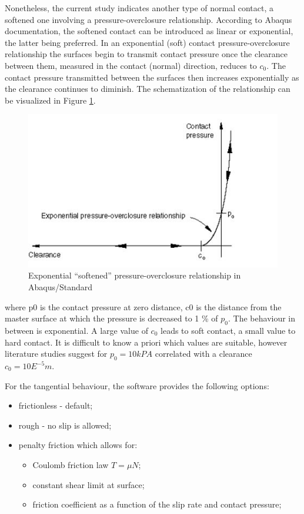 Nonetheless, the current study indicates another type of normal contact, a softened one involving a pressure-overclosure relationship. According to Abaqus documentation, the softened contact can be introduced as linear or exponential, the latter being preferred. In an exponential (soft) contact pressure-overclosure relationship the surfaces begin to transmit contact pressure once the clearance between them, measured in the contact (normal) direction, reduces to $c_0$. The contact pressure transmitted between the surfaces then increases exponentially as the clearance continues to diminish. The schematization of the relationship can be visualized in Figure \ref{pressure}.
\begin{figure}[!h]
	\centering
	\includegraphics[width=0.45 \linewidth]{"pressure"}
	\caption{Exponential “softened” pressure-overclosure relationship in Abaqus/Standard}
	\label{pressure}
\end{figure} 

where \gls{p0} is the contact pressure at zero distance, \gls{c0} is the distance from the master surface at which the pressure is decreased to 1 \% of $ p_0$. The behaviour in between is exponential. A large value of $ c_0$ leads to soft contact, a small value to hard contact. It is difficult to know a priori which values are suitable, however literature studies suggest for $p_0=10 kPA$ correlated with a clearance $c_0=10E^{-5} m$.


For the tangential behaviour, the software provides the following options:
\begin{itemize}
	\item frictionless - default;
	\item rough - no slip is allowed;
	\item penalty friction which allows for:
		\begin{itemize}
			\item Coulomb friction law $T=\mu N$;
			\item constant shear limit at surface;
			\item friction coefficient as a function of the slip rate and contact pressure;
		\end{itemize}
\end{itemize}

